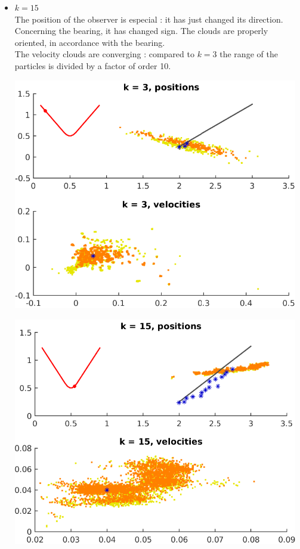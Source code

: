 \documentclass[english,DIV=13]{scrreprt}
\begin{document}
\begin{itemize}
\item $k=15$\\
The position of the observer is especial : it has just changed its direction. Concerning the bearing,
it has changed sign. The clouds are properly oriented, in accordance with the bearing.\\
The velocity clouds are converging : compared to $k=3$ the range of the particles is divided by a factor of order 10.

  \begin{center}
	\begin{minipage}{.5\textwidth}
   		\includegraphics[width=0.98\textwidth]{img/q4_3.png}
	\end{minipage}%
	\begin{minipage}{.5\textwidth}
		 \includegraphics[width=0.98\textwidth]{img/q4_15.png}

\end{minipage}
\end{center}
\end{itemize}
\end{document}
